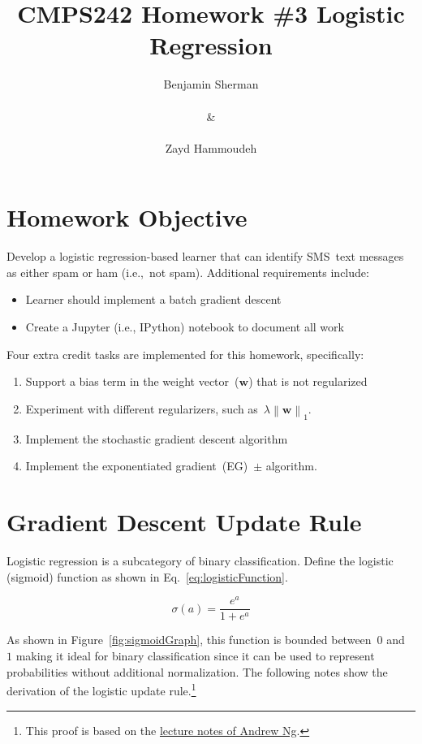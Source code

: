 \documentclass{report}
\title{\textbf{CMPS242 Homework \#3 \textendash{} Logistic Regression}}
\author{Benjamin Sherman \\~\\ \& \\~\\ Zayd Hammoudeh}
\newcommand{\norm}[1]{\left\lVert#1\right\rVert}
\newcommand{\w}{\mathbf{w}}
\begin{document}
  \maketitle
  
  \suppressfloats
  \section{Homework Objective}
  
  Develop a logistic regression-based learner that can identify SMS~text messages as either spam or ham (i.e.,~not spam).  Additional requirements include:
  
  \begin{itemize}
    \setlength\itemsep{0pt}
    \item Learner should implement a batch gradient descent
    \item Create a Jupyter (i.e., IPython) notebook to document all work
  \end{itemize}

  \noindent
  Four extra credit tasks are implemented for this homework, specifically:
  
  \begin{enumerate}
    \setlength\itemsep{0pt}
    \item Support a bias term in the weight vector~($\mathbf{w}$) that is not regularized
    \item Experiment with different regularizers, such as~$\lambda\norm{\w}_1$.
    \item Implement the stochastic gradient descent algorithm
    \item Implement the exponentiated gradient~(EG)~$\pm$ algorithm.
  \end{enumerate}
 
  \section{Gradient Descent Update Rule}
  
  Logistic regression is a subcategory of binary classification.  Define the logistic (sigmoid) function as shown in Eq.~\eqref{eq:logisticFunction}.
  
  \begin{equation}
    \sigma(a) = \frac{e^{a}}{1+e^{a}}\label{eq:logisticFunction}
  \end{equation}
  
  \noindent
  As shown in Figure~\ref{fig:sigmoidGraph}, this function is bounded between~$0$ and~$1$ making it ideal for binary classification since it can be used to represent probabilities without additional normalization. The following notes show the derivation of the logistic update rule.\footnote{This proof is based on the \href{http://cs229.stanford.edu/notes/cs229-notes1.pdf}{lecture notes of Andrew Ng}.}
  
\end{document}
